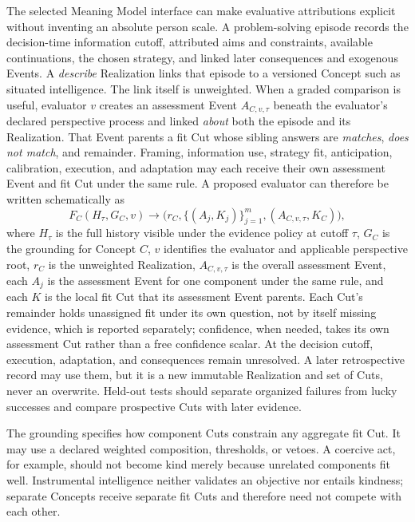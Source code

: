 \documentclass[10pt]{article}
\begin{document}
The selected Meaning Model interface can make evaluative attributions explicit without inventing
an absolute person scale. A problem-solving episode records the decision-time
information cutoff, attributed aims and constraints, available continuations,
the chosen strategy, and linked later consequences and exogenous Events. A
\emph{describe} Realization links that episode to a versioned Concept such as
situated intelligence. The link itself is unweighted. When a graded comparison
is useful, evaluator $v$ creates an assessment Event $A_{C,v,\tau}$ beneath
the evaluator's declared perspective process and linked
\emph{about} both the episode and its Realization. That
Event parents a fit Cut whose sibling answers are \emph{matches}, \emph{does
not match}, and remainder. Framing, information use, strategy fit,
anticipation, calibration, execution, and adaptation may each receive their
own assessment Event and fit Cut under the same rule. A proposed evaluator can
therefore be written schematically as
\begin{equation}
 F_C(H_{\tau},G_C,v)\longrightarrow
   \bigl(r_C,\{(A_j,K_j)\}_{j=1}^{m},(A_{C,v,\tau},K_C)\bigr),
 \label{eq:evaluative-predictor}
\end{equation}
where $H_{\tau}$ is the full history visible under the evidence policy at
cutoff $\tau$, $G_C$ is the grounding for Concept $C$,
$v$ identifies the evaluator and applicable perspective root,
$r_C$ is the unweighted Realization, $A_{C,v,\tau}$ is the overall
assessment Event, each $A_j$ is the assessment Event for one component under the
same rule, and each $K$ is the local fit Cut that its assessment Event parents. Each Cut's remainder holds unassigned fit under its own
question, not by itself missing evidence, which is reported separately;
confidence, when needed, takes its own assessment Cut rather than a free
confidence scalar. At the decision cutoff, execution, adaptation,
and consequences remain unresolved. A later retrospective record may use them,
but it is a new immutable Realization and set of Cuts, never an overwrite.
Held-out tests should separate organized failures from lucky successes and
compare prospective Cuts with later evidence.

The grounding specifies how component Cuts constrain any aggregate fit Cut. It
may use a declared weighted composition, thresholds, or vetoes. A coercive act,
for example, should not become kind merely because unrelated components fit
well. Instrumental intelligence neither validates an objective nor entails
kindness; separate Concepts receive separate fit Cuts and therefore need not
compete with each other.
\end{document}
